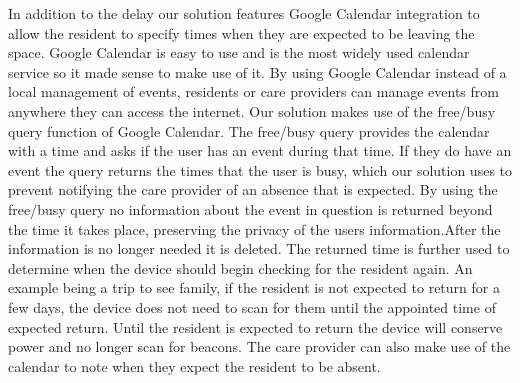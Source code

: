 \documentclass[11pt]{article}
\begin{document}
In addition to the delay our solution features Google Calendar integration to allow the resident to specify times when they are expected to be leaving the space. Google Calendar is easy to use and is the most widely used calendar service\cite{henry} so it made sense to make use of it. By using Google Calendar instead of a local management of events, residents or care providers can manage events from anywhere they can access the internet. Our solution makes use of the free/busy query function of Google Calendar. The free/busy query provides the calendar with a time and asks if the user has an event during that time. If they do have an event the query returns the times that the user is busy, which our solution uses to prevent notifying the care provider of an absence that is expected. By using the free/busy query no information about the event in question is returned beyond the time it takes place, preserving the privacy of the users information.After the information is no longer needed it is deleted. The returned time is further used to determine when the device should begin checking for the resident again. An example being a trip to see family, if the resident is not expected to return for a few days, the device does not need to scan for them until the appointed time of expected return. Until the resident is expected to return the device will conserve power and no longer scan for beacons.  The care provider can also make use of the calendar to note when they expect the resident to be absent.



 
 


\printbibliography
\end{document}
